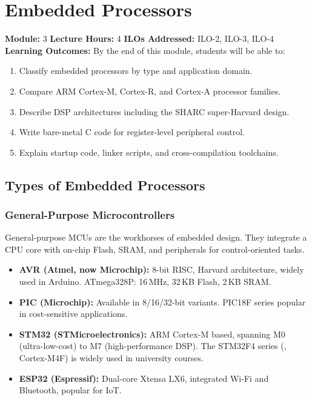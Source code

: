 
\chapter{Embedded Processors}
\label{ch:processors}

\begin{moduleinfo}
  \textbf{Module:} 3 \quad
  \textbf{Lecture Hours:} 4 \quad
  \textbf{ILOs Addressed:} ILO-2, ILO-3, ILO-4 \\[4pt]
  \textbf{Learning Outcomes:} By the end of this module, students will be able to:
  \begin{enumerate}[nosep]
    \item Classify embedded processors by type and application domain.
    \item Compare ARM Cortex-M, Cortex-R, and Cortex-A processor families.
    \item Describe DSP architectures including the SHARC super-Harvard design.
    \item Write bare-metal C code for register-level peripheral control.
    \item Explain startup code, linker scripts, and cross-compilation toolchains.
  \end{enumerate}
\end{moduleinfo}

\section{Types of Embedded Processors}
\label{sec:proc:types}

\subsection{General-Purpose Microcontrollers}

General-purpose MCUs are the workhorses of embedded design. They integrate a CPU core with on-chip Flash, SRAM, and peripherals for control-oriented tasks.

\begin{itemize}
  \item \textbf{AVR (Atmel, now Microchip):} 8-bit RISC, Harvard architecture, widely used in Arduino. ATmega328P: 16\,MHz, 32\,KB Flash, 2\,KB SRAM.
  \item \textbf{PIC (Microchip):} Available in 8/16/32-bit variants. PIC18F series popular in cost-sensitive applications.
  \item \textbf{STM32 (STMicroelectronics):} ARM Cortex-M based, spanning M0 (ultra-low-cost) to M7 (high-performance DSP). The STM32F4 series (, Cortex-M4F) is widely used in university courses.
  \item \textbf{ESP32 (Espressif):} Dual-core Xtensa LX6, integrated Wi-Fi and Bluetooth, popular for IoT.
\end{itemize}

